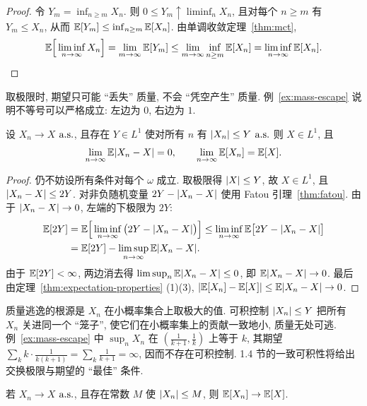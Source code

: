 \begin{proof}
令 $Y_m=\inf_{n\ge m}X_n$. 则 $0\le Y_m\uparrow\liminf_n X_n$, 且对每个 $n\ge m$ 有 $Y_m\le X_n$, 从而 $\mathbb{E}[Y_m]\le\inf_{n\ge m}\mathbb{E}[X_n]$. 由单调收敛定理~\ref{thm:mct},
\[
\mathbb{E}\Big[\liminf_{n\to\infty}X_n\Big]=\lim_{m\to\infty}\mathbb{E}[Y_m]\le\lim_{m\to\infty}\inf_{n\ge m}\mathbb{E}[X_n]=\liminf_{n\to\infty}\mathbb{E}[X_n].\qedhere
\]
\end{proof}

\begin{intuition}
取极限时, 期望只可能 ``丢失'' 质量, 不会 ``凭空产生'' 质量. 例~\ref{ex:mass-escape} 说明不等号可以严格成立: 左边为 $0$, 右边为 $1$.
\end{intuition}

\begin{theorem}\label{thm:dct}
设 $X_n\to X$ $\text{a.s.}$, 且存在 $Y\in L^1$ 使对所有 $n$ 有 $\lvert X_n\rvert\le Y$ $\text{a.s.}$ 则 $X\in L^1$, 且
\[
\lim_{n\to\infty}\mathbb{E}\lvert X_n-X\rvert=0,\qquad \lim_{n\to\infty}\mathbb{E}[X_n]=\mathbb{E}[X].
\]
\end{theorem}

\begin{proof}
仍不妨设所有条件对每个 $\omega$ 成立. 取极限得 $\lvert X\rvert\le Y$, 故 $X\in L^1$, 且 $\lvert X_n-X\rvert\le2Y$. 对非负随机变量 $2Y-\lvert X_n-X\rvert$ 使用 Fatou 引理~\ref{thm:fatou}. 由于 $\lvert X_n-X\rvert\to0$, 左端的下极限为 $2Y$:
\begin{align*}
\mathbb{E}[2Y]&=\mathbb{E}\Big[\liminf_{n\to\infty}\big(2Y-\lvert X_n-X\rvert\big)\Big]\le\liminf_{n\to\infty}\mathbb{E}\big[2Y-\lvert X_n-X\rvert\big]\\
&=\mathbb{E}[2Y]-\limsup_{n\to\infty}\mathbb{E}\lvert X_n-X\rvert.
\end{align*}
由于 $\mathbb{E}[2Y]<\infty$, 两边消去得 $\limsup_n\mathbb{E}\lvert X_n-X\rvert\le0$, 即 $\mathbb{E}\lvert X_n-X\rvert\to0$. 最后由定理~\ref{thm:expectation-properties} (1)(3), $\lvert\mathbb{E}[X_n]-\mathbb{E}[X]\rvert\le\mathbb{E}\lvert X_n-X\rvert\to0$.
\end{proof}

\begin{intuition}
质量逃逸的根源是 $X_n$ 在小概率集合上取极大的值. 可积控制 $\lvert X_n\rvert\le Y$ 把所有 $X_n$ 关进同一个 ``笼子'', 使它们在小概率集上的贡献一致地小, 质量无处可逃. 例~\ref{ex:mass-escape} 中 $\sup_n X_n$ 在 $(\frac{1}{k+1},\frac{1}{k})$ 上等于 $k$, 其期望 $\sum_k k\cdot\frac{1}{k(k+1)}=\sum_k\frac{1}{k+1}=\infty$, 因而不存在可积控制. 1.4 节的一致可积性将给出交换极限与期望的 ``最佳'' 条件.
\end{intuition}

\begin{corollary}[有界收敛定理]\label{cor:bct}
若 $X_n\to X$ $\text{a.s.}$, 且存在常数 $M$ 使 $\lvert X_n\rvert\le M$, 则 $\mathbb{E}[X_n]\to\mathbb{E}[X]$.
\end{corollary}

